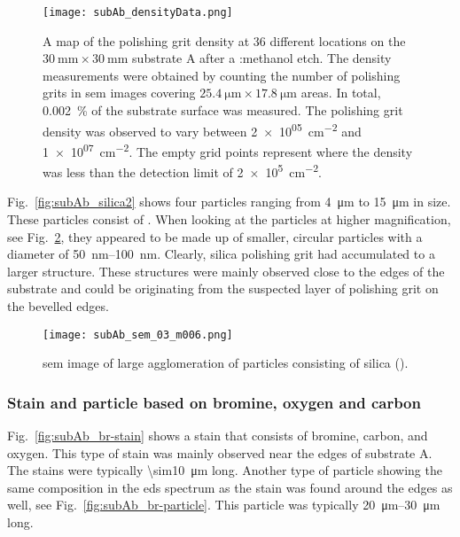 \begin{figure}[htbp]
    \centering
    \texttt{[image: subAb\_densityData.png]}
    \caption[Map of the polishing grit density on substrate A after a :methanol etch.]{A map of the polishing grit density at 36 different locations on the $\SI{30}{\milli\metre}\times\SI{30}{\milli\metre}$ substrate A after a :methanol etch. The density measurements were obtained by counting the number of polishing grits in \ac{sem} images covering $\SI{25.4}{\micro\metre}\times\SI{17.8}{\micro\metre}$ areas. In total, \SI{0.002}{\percent} of the substrate surface was measured. The polishing grit density was observed to vary between \SI{2e+05}{\centi\metre^{-2}} and \SI{1e+07}{\centi\metre^{-2}}. The empty grid points represent where the density was less than the detection limit of \SI{2e+5}{\centi\metre^{-2}}.}
    \label{fig:subAb_densityData}
\end{figure}

Fig.~\ref{fig:subAb_silica2} shows four particles ranging from \SI{4}{\micro\metre} to \SI{15}{\micro\metre} in size. These particles consist of . When looking at the particles at higher magnification, see Fig.~\ref{fig:subAb_silica2_magnified}, they appeared to be made up of smaller, circular particles with a diameter of \SIrange{50}{100}{\nano\metre}. Clearly, silica polishing grit had accumulated to a larger structure. These structures were mainly observed close to the edges of the substrate and could be originating from the suspected layer of polishing grit on the bevelled edges.

\begin{figure}
    \centering
    \texttt{[image: subAb\_sem\_03\_m006.png]}
    \caption[\Ac{sem} image of large silica agglomeration.]{\Ac{sem} image of large agglomeration of particles consisting of silica ().}\label{fig:subAb_silica2_magnified}
\end{figure}

\subsubsection{Stain and particle based on bromine, oxygen and carbon}

Fig.~\ref{fig:subAb_br-stain} shows a stain that consists of bromine, carbon, and oxygen. This type of stain was mainly observed  near the edges of substrate A. The stains were typically \SI{\sim10}{\micro\metre} long. Another type of particle showing the same composition in the \ac{eds} spectrum as the stain was found around the edges as well, see Fig.~\ref{fig:subAb_br-particle}. This particle was typically \SIrange{20}{30}{\micro\metre} long.

